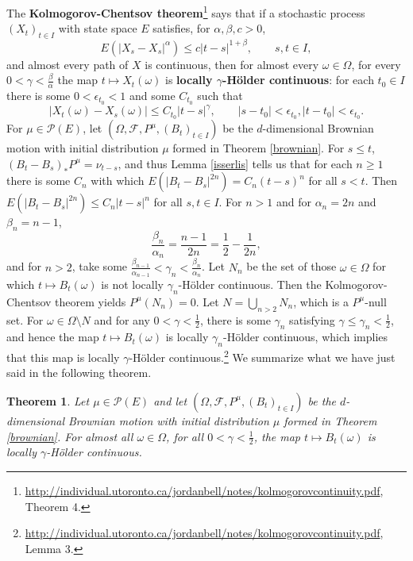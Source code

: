 \documentclass{article}
\newtheorem{theorem}{Theorem}
\theoremstyle{definition}
\begin{document}
The \textbf{Kolmogorov-Chentsov theorem}\footnote{\url{http://individual.utoronto.ca/jordanbell/notes/kolmogorovcontinuity.pdf},
Theorem 4.} says that if a stochastic process $(X_t)_{t \in I}$ with state space
$E$ satisfies, for 
$\alpha,\beta,c>0$,
\[
E(|X_s-X_s|^\alpha) \leq c |t-s|^{1+\beta}, \qquad s,t \in I,
\]
and almost every path of $X$ is continuous, then for almost every $\omega \in \Omega$, for every
$0<\gamma<\frac{\beta}{\alpha}$ the map $t \mapsto X_t(\omega)$ is \textbf{locally
$\gamma$-H\"older continuous}: for each $t_0 \in I$ there is some $0<\epsilon_{t_0}<1$ and
some $C_{t_0}$ such that
\[
|X_t(\omega)-X_s(\omega)| \leq C_{t_0}|t-s|^\gamma, \qquad |s-t_0|<\epsilon_{t_0}, |t-t_0|<\epsilon_{t_0}.
\]
For $\mu \in \mathscr{P}(E)$,
let $(\Omega,\mathscr{F},P^\mu,(B_t)_{t \in I})$
be the $d$-dimensional Brownian motion with initial distribution $\mu$ formed in Theorem \ref{brownian}.
For $s \leq  t$, $(B_t-B_s)_*P^\mu = \nu_{t-s}$, and thus
Lemma \ref{isserlis}  tells us that for each $n \geq 1$ there is some $C_n$ with which
 $E(|B_t-B_s|^{2n}) = C_n (t-s)^n$ for all $s<t$. Then $E(|B_t-B_s|^{2n}) \leq C_n|t-s|^n$ for all $s,t \in I$.
 For $n >1$ and for $\alpha_n=2n$ and $\beta_n=n-1$, 
 \[
 \frac{\beta_n}{\alpha_n} = \frac{n-1}{2n} = \frac{1}{2} - \frac{1}{2n},
 \]
 and for $n>2$, take some $\frac{\beta_{n-1}}{\alpha_{n-1}}<\gamma_n<\frac{\beta_n}{\alpha_n}$.  
Let $N_n$ be the set of those $\omega \in \Omega$ for which
$t \mapsto B_t(\omega)$ is not locally $\gamma_n$-H\"older continuous. Then the Kolmogorov-Chentsov theorem yields
$P^\mu(N_n)=0$.
Let $N = \bigcup_{n>2} N_n$, which is a $P^\mu$-null set. For $\omega \in \Omega \setminus N$ and for any 
$0<\gamma<\frac{1}{2}$, 
there is some $\gamma_n$ satisfying $\gamma \leq \gamma_n<\frac{1}{2}$, and hence 
the map $t \mapsto B_t(\omega)$ is 
locally $\gamma_n$-H\"older continuous, which implies that this map is locally $\gamma$-H\"older continuous.\footnote{\url{http://individual.utoronto.ca/jordanbell/notes/kolmogorovcontinuity.pdf}, Lemma 3.}
We summarize what we have just said in the following theorem. 

\begin{theorem}
Let $\mu \in \mathscr{P}(E)$ and let
$(\Omega,\mathscr{F},P^\mu,(B_t)_{t \in I})$ be the $d$-dimensional Brownian motion with initial distribution
$\mu$ 
formed in Theorem \ref{brownian}. For almost all $\omega \in \Omega$, for all $0<\gamma<\frac{1}{2}$, the map
$t \mapsto B_t(\omega)$  is locally $\gamma$-H\"older continuous.
\end{theorem}
\end{document}
